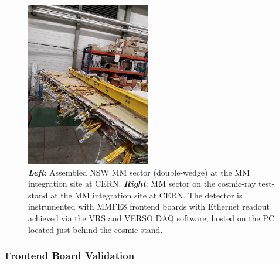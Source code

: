 \begin{figure}[!htb]
    \begin{center}
        \includegraphics[width=0.48\textwidth]{figures/nsw/use_cases/mm_bb5}
        \caption{
            \textbf{\textit{Left}}: Assembled NSW MM sector (double-wedge) at the MM integration
                site at CERN.
            \textbf{\textit{Right}}: MM sector on the cosmic-ray test-stand at the MM integration site
                at CERN. The detector is instrumented with MMFE8 frontend boards with Ethernet readout
                achieved via the VRS and VERSO DAQ software, hosted on the PC located just behind the cosmic
                stand.
        }
        \label{fig:mm_bb5}
    \end{center}
\end{figure}


\subsubsection{Frontend Board Validation}
\label{sec:verso_noise}

